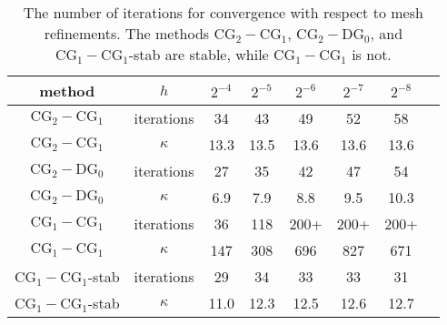 \begin{table}
\begin{center}
\begin{tabular}{|c|c||c|c|c|c|c|c|}
\hline
method & $h$ & $2^{-4}$ & $2^{-5}$ & $2^{-6}$ & $2^{-7}$ & $2^{-8}$ \\ \hline\hline
$\mathrm{CG}_2-\mathrm{CG}_1$ &  iterations & 34 & 43 & 49 & 52 & 58 \\ \hline 
$\mathrm{CG}_2-\mathrm{CG}_1$ & $\kappa $ & 13.3 & 13.5 & 13.6 & 13.6 & 13.6 \\ \hline 
$\mathrm{CG}_2-\mathrm{DG}_0$ &  iterations & 27 & 35 & 42 & 47 & 54 \\ \hline 
$\mathrm{CG}_2-\mathrm{DG}_0$ & $\kappa $ & 6.9 & 7.9 & 8.8 & 9.5 & 10.3 \\ \hline 
$\mathrm{CG}_1-\mathrm{CG}_1$ & iterations & 36 & 118 & 200+ & 200+ & 200+ \\ \hline 
$\mathrm{CG}_1-\mathrm{CG}_1$ & $\kappa$ & 147 & 308 & 696 & 827 & 671 \\ \hline 
$\mathrm{CG}_1-\mathrm{CG}_1$-stab& iterations & 29 & 34 & 33 & 33 & 31 \\ \hline 
$\mathrm{CG}_1-\mathrm{CG}_1$-stab& $\kappa $ & 11.0 & 12.3 & 12.5 & 12.6 & 12.7 \\ \hline 
\end{tabular}
\caption{The number of iterations for 
  convergence with respect to mesh refinements.
  The methods $\mathrm{CG}_2-\mathrm{CG}_1$, $\mathrm{CG}_2-\mathrm{DG}_0$, and $\mathrm{CG}_1-\mathrm{CG}_1$-stab are stable, while $\mathrm{CG}_1-\mathrm{CG}_1$ is not.}\label{stokes:ex} 
\end{center}
\end{table}

